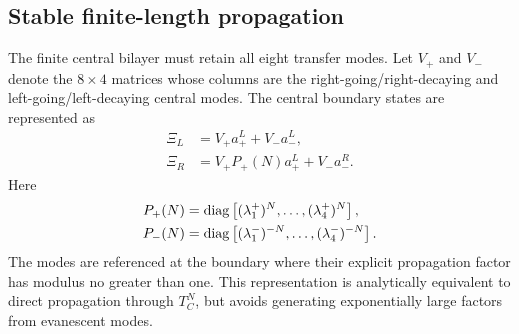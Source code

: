 \subsection{Stable finite-length propagation}
\label{subsec:stable-propagation}

The finite central bilayer must retain all eight transfer modes.  Let $V_+$ and $V_-$ denote the $8\times4$ matrices whose columns are the right-going/right-decaying and left-going/left-decaying central modes.  The central boundary states are represented as
\begin{align}
    \Xi_L &= V_+ a_+^L+V_- a_-^L,
    \label{eq:central-left-state}\\
    \Xi_R &= V_+ P_+(N)a_+^L+V_- a_-^R.
    \label{eq:central-right-state}
\end{align}
Here
\begin{align}
    P_+(N)&=\operatorname{diag}\left[(\lambda_1^+)^N,\ldots,(\lambda_4^+)^N\right],
    \label{eq:P-plus}\\
    P_-(N)&=\operatorname{diag}\left[(\lambda_1^-)^{-N},\ldots,(\lambda_4^-)^{-N}\right].
    \label{eq:P-minus}
\end{align}
The modes are referenced at the boundary where their explicit propagation factor has modulus no greater than one.  This representation is analytically equivalent to direct propagation through $T_C^N$, but avoids generating exponentially large factors from evanescent modes.

